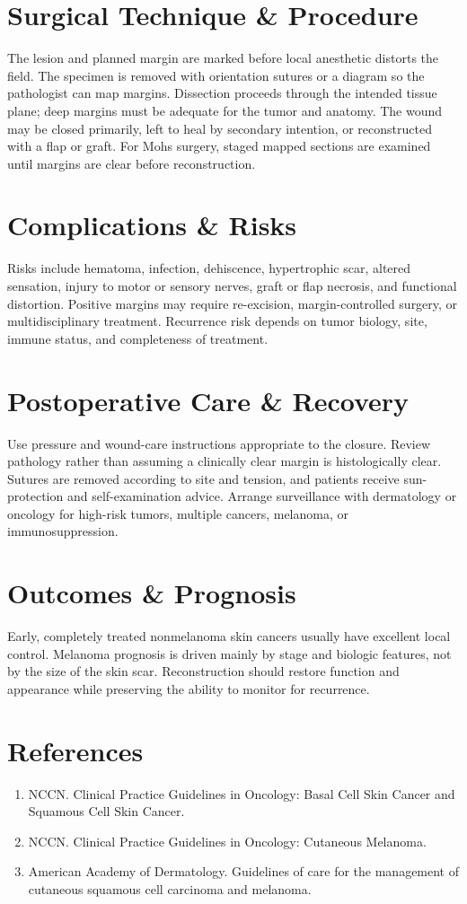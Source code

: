 \section*{Surgical Technique \& Procedure}
The lesion and planned margin are marked before local anesthetic distorts the field. The specimen is removed with orientation sutures or a diagram so the pathologist can map margins. Dissection proceeds through the intended tissue plane; deep margins must be adequate for the tumor and anatomy. The wound may be closed primarily, left to heal by secondary intention, or reconstructed with a flap or graft. For Mohs surgery, staged mapped sections are examined until margins are clear before reconstruction.

\section*{Complications \& Risks}
Risks include hematoma, infection, dehiscence, hypertrophic scar, altered sensation, injury to motor or sensory nerves, graft or flap necrosis, and functional distortion. Positive margins may require re-excision, margin-controlled surgery, or multidisciplinary treatment. Recurrence risk depends on tumor biology, site, immune status, and completeness of treatment.

\section*{Postoperative Care \& Recovery}
Use pressure and wound-care instructions appropriate to the closure. Review pathology rather than assuming a clinically clear margin is histologically clear. Sutures are removed according to site and tension, and patients receive sun-protection and self-examination advice. Arrange surveillance with dermatology or oncology for high-risk tumors, multiple cancers, melanoma, or immunosuppression.

\section*{Outcomes \& Prognosis}
Early, completely treated nonmelanoma skin cancers usually have excellent local control. Melanoma prognosis is driven mainly by stage and biologic features, not by the size of the skin scar. Reconstruction should restore function and appearance while preserving the ability to monitor for recurrence.

\section*{References}
\begin{enumerate}
\item NCCN. Clinical Practice Guidelines in Oncology: Basal Cell Skin Cancer and Squamous Cell Skin Cancer.
\item NCCN. Clinical Practice Guidelines in Oncology: Cutaneous Melanoma.
\item American Academy of Dermatology. Guidelines of care for the management of cutaneous squamous cell carcinoma and melanoma.
\end{enumerate}
